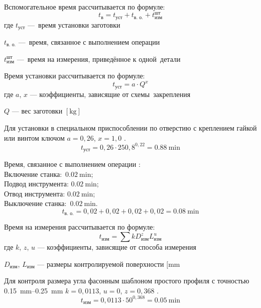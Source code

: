 \documentclass[14pt,russian,a4paper]{extreport}
\begin{document}
Вспомогательное время рассчитывается по формуле:
\begin{equation*}
  t_\text{в} = t_\text{уст} + t_\text{в. о.} + t_\text{изм}^\text{шт}
\end{equation*}
где $t_\text{уст}$ --- время установки заготовки \par
$t_\text{в. о.}$ --- время, связанное с выполнением операции \par
$t_\text{изм}^\text{шт}$ --- время на измерения, приведённое к одной детали

Время установки рассчитывается по формуле:
\begin{equation*}
  t_\text{уст} = a \cdot Q^x
\end{equation*}
где $a$, $x$ --- коэффициенты, зависящие от схемы закрепления \par
$Q$ --- вес заготовки $\left[\si{\kilo\gram}\right]$

Для установки в специальном приспособлении по отверстию с креплением гайкой или винтом ключом $ a = 0,26 $, $ x = 1,0 $ \cite[прил.~3]{malzen:normirovanie}.
\begin{equation*}
  t_\text{уст} = 0,26 \cdot 250,8^{0,22} = \SI{0,88}{\minute}
\end{equation*}

Время, связанное с выполнением операции \cite[прил.~4]{malzen:normirovanie}: \\
Включение станка: $\SI{0,02}{\minute}$; \\
Подвод инструмента: $\SI{0,02}{\minute}$; \\
Отвод инструмента: $\SI{0,02}{\minute}$; \\
Выключение станка: $\SI{0,02}{\minute}$. \\
\begin{equation*}
  t_\text{в. о.} = 0,02 + 0,02 + 0,02 + 0,02 = \SI{0,08}{\minute}
\end{equation*}

Время на измерения рассчитывается по формуле:
\begin{equation*}
  t_\text{изм} = \sum k D_\text{изм}^z L_\text{изм}^u
\end{equation*}
где $k$, $z$, $u$ --- коэффициенты, зависящие от способа измерения \par
$D_\text{изм}$, $L_\text{изм}$ --- размеры контролируемой поверхности $[\si{\milli\meter}$

Для контроля размера угла фасонным шаблоном простого профиля с точностью \SIrange{0,15}{0,25}{\milli\meter} $ k = 0,0113 $, $ u = 0 $, $ z = 0,368 $ \cite[прил.~5]{malzen:normirovanie}.
\begin{equation*}
  t_\text{изм} = 0,0113 \cdot 50^{0,368} = \SI{0,05}{\minute}
\end{equation*}
\end{document}
